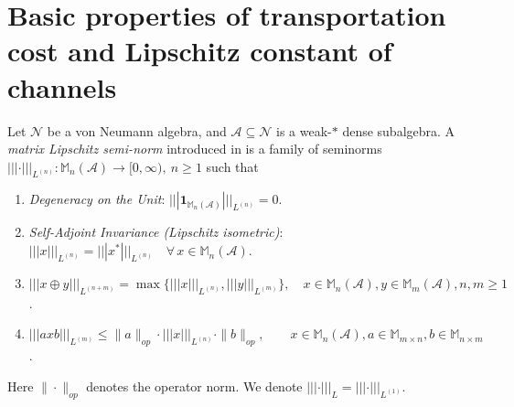 \documentclass[11pt,reqno]{amsart}
\numberwithin{equation}{section}
\newcommand{\mb}{\mathbb}
\newcommand{\mc}{\mathcal}
\begin{document}
\section{Basic properties of transportation cost and Lipschitz constant of channels}\label{sec:basic}
Let $\mc N$ be a von Neumann algebra, and $\mc A \subseteq \mc N$ is a weak-$*$ dense subalgebra. A \textit{matrix Lipschitz semi-norm} introduced in \cite{wu2005noncommutativemetricsmatrixstate} is a family of seminorms $|||\cdot|||_{L^{(n)}}: \mb M_n(\mc A) \to [0,\infty),\ n\ge 1$ such that 
\begin{enumerate}
    \item \label{assump:unit vanish} \textit{Degeneracy on the Unit}: $|||\mathbf{1}_{\mb M_n(\mc A)}|||_{L^{(n)}} = 0.$
    \item \label{assump:self adjoint} \textit{Self-Adjoint Invariance (Lipschitz isometric)}: $|||x|||_{L^{(n)}} = |||x^*|||_{L^{(n)}} \quad \forall\, x \in \mb M_n(\mc A)$.
    \item \label{assump:max direct sum} $|||x \oplus y|||_{L^{(n+m)}} = \max\{|||x|||_{L^{(n)}}, |||y|||_{L^{(m)}}\},\quad x\in \mb M_n(\mc A), y \in \mb M_m(\mc A), n,m\ge 1$.
    \item \label{assump: triangle inequality} $ |||axb|||_{L^{(m)}} \le \|a\|_{op}\cdot |||x|||_{L^{(n)}} \cdot \|b\|_{op},\quad \quad x\in \mb M_n(\mc A), a\in \mb M_{m\times n}, b\in \mb M_{n\times m}$.
\end{enumerate}
Here $\|\cdot\|_{op}$ denotes the operator norm. We denote $|||\cdot|||_L = |||\cdot|||_{L^{(1)}}$.
\end{document}
